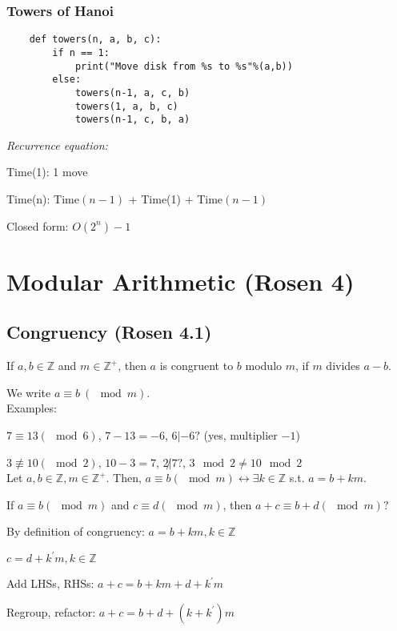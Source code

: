 \documentclass[english,openany]{book}
\begin{document}
    \subsection{Towers of Hanoi}

    \begin{lstlisting}
    def towers(n, a, b, c):
        if n == 1:
            print("Move disk from %s to %s"%(a,b))
        else:
            towers(n-1, a, c, b)
            towers(1, a, b, c)
            towers(n-1, c, b, a)
    \end{lstlisting}

    \textit{Recurrence equation:}

    Time(1): 1 move

    Time(n): Time$(n-1)$ + Time(1) + Time$(n-1)$

    Closed form: $O(2^n) - 1$

    \chapter{Modular Arithmetic (Rosen 4)}

    \section{Congruency (Rosen 4.1)}

    If $a, b \in \mathbb Z$ and $m \in \mathbb Z^+$, then $a$ is congruent to $b$ modulo $m$, if $m$ divides $a-b$.

    We write $a \equiv b\ (\mod m)$.\\

    Examples:

    $7 \equiv 13 (\mod 6)$, $7 - 13 = -6$, $6 | -6 ?$ (yes, multiplier $-1$)

    $3 \not\equiv 10 (\mod 2)$, $10 - 3 = 7$, $2 \not| 7 ?$, $3 \mod 2 \neq 10 \mod 2$\\

    Let $a,b \in \mathbb Z, m \in \mathbb Z^+$. Then, $a \equiv b (\mod m) \leftrightarrow \exists k \in \mathbb Z$ s.t. $a = b + km$.

    If $a \equiv b (\mod m)$ and $c \equiv d (\mod m)$, then $a + c \equiv b + d (\mod m) ?$

    By definition of congruency: $a = b + km, k \in \mathbb Z$

    $c = d + k^{'} m, k \in \mathbb Z$

    Add LHSs, RHSs: $a+c = b + km + d + k^{'} m$

    Regroup, refactor: $a + c = b + d + (k + k^{'})m$
\end{document}
